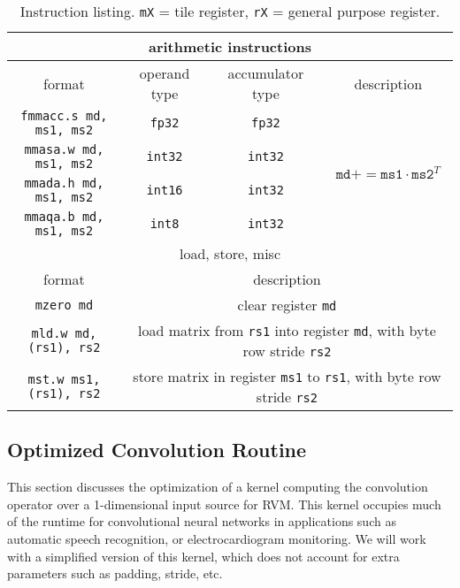 \documentclass[acmsmall, nonacm=true]{acmart}
\newcommand{\pluseq}{\mathrel{{+}{=}}}
\begin{document}
\begin{table}[h]
\begin{tabular}{|c|c|c|c|}
\multicolumn{4}{c}{arithmetic instructions} \\ \hline\hline
format & operand type & accumulator type & description \\ \hline
\verb|fmmacc.s md, ms1, ms2| & \verb|fp32| & \verb|fp32|  & \multirow{4}{*}{$\texttt{md} \pluseq \texttt{ms1}\cdot \texttt{ms2}^T$} \\ 
\verb|mmasa.w md, ms1, ms2| & \verb|int32| & \verb|int32| & \\
\verb|mmada.h md, ms1, ms2| & \verb|int16| & \verb|int32| & \\
\verb|mmaqa.b md, ms1, ms2| & \verb|int8| & \verb|int32| & \\
\hline\hline
\multicolumn{4}{c}{load, store, misc} \\ \hline\hline
format & \multicolumn{3}{c|}{description} \\ \hline
\verb|mzero md| & \multicolumn{3}{c|}{clear register \texttt{md}} \\
\verb|mld.w md, (rs1), rs2| & \multicolumn{3}{c|}{load matrix from \texttt{rs1} into register \texttt{md}, with byte row stride \texttt{rs2}} \\
\verb|mst.w ms1, (rs1), rs2| & \multicolumn{3}{c|}{store matrix in register \texttt{ms1} to \texttt{rs1}, with byte row stride \texttt{rs2}} \\ \hline
\end{tabular}
\caption{Instruction listing. \texttt{mX} = tile register, \texttt{rX} = general purpose register.}
\label{tbl:isa}
\end{table}

\subsection{Optimized Convolution Routine}

This section discusses the optimization of a kernel computing the convolution operator over a 1-dimensional input source for RVM. This kernel occupies much of the runtime for convolutional neural networks in applications such as automatic speech recognition, or electrocardiogram monitoring\cite{conv1d_survey}. We will work with a simplified version of this kernel, which does not account for extra parameters such as padding, stride, etc. 
\end{document}
